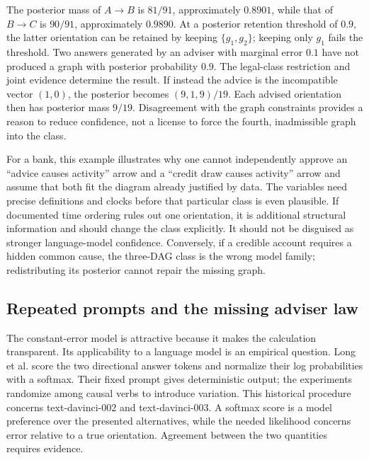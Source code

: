 The posterior mass of $A\to B$ is $81/91$, approximately $0.8901$, while that
of $B\to C$ is $90/91$, approximately $0.9890$. At a posterior retention
threshold of $0.9$, the latter orientation can be retained by keeping
$\{g_1,g_2\}$; keeping only $g_1$ fails the threshold. Two answers generated by
an adviser with marginal error $0.1$ have not produced a graph with posterior
probability $0.9$. The legal-class restriction and joint evidence determine
the result. If instead the advice is the incompatible vector $(1,0)$, the
posterior becomes $(9,1,9)/19$. Each advised orientation then has posterior
mass $9/19$. Disagreement with the graph constraints provides a reason to
reduce confidence, not a license to force the fourth, inadmissible graph into
the class.

For a bank, this example illustrates why one cannot independently approve an
``advice causes activity'' arrow and a ``credit draw causes activity'' arrow
and assume that both fit the diagram already justified by data. The variables
need precise definitions and clocks before that particular class is even
plausible. If documented time ordering rules out one orientation, it is
additional structural information and should change the class explicitly.
It should not be disguised as stronger language-model confidence. Conversely,
if a credible account requires a hidden common cause, the three-DAG class is
the wrong model family; redistributing its posterior cannot repair the missing
graph.

\subsection{Repeated prompts and the missing adviser law}

The constant-error model is attractive because it makes the calculation
transparent. Its applicability to a language model is an empirical question.
Long et al. score the two directional answer tokens and normalize their log
probabilities with a softmax. Their fixed prompt gives deterministic output;
the experiments randomize among causal verbs to introduce variation. This
historical procedure concerns text-davinci-002 and text-davinci-003. A softmax
score is a model preference over the presented alternatives, while the needed
likelihood concerns error relative to a true orientation. Agreement between
the two quantities requires evidence.\citep{exec17_imperfect_experts}

